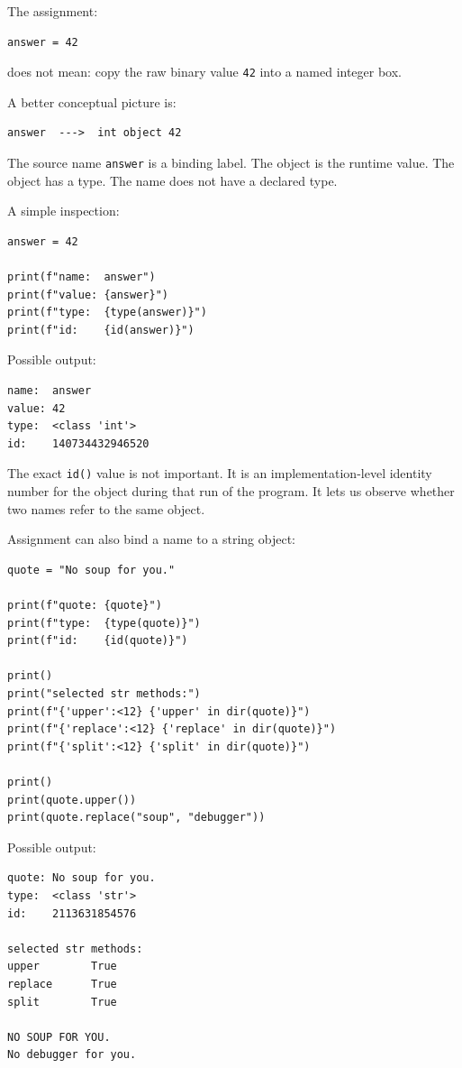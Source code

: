 The assignment:

\begin{verbatim}
answer = 42
\end{verbatim}

does not mean: copy the raw binary value \texttt{42} into a named integer box.

A better conceptual picture is:

\begin{verbatim}
answer  --->  int object 42
\end{verbatim}

The source name \texttt{answer} is a binding label. The object is the runtime value. The object has a type. The name does not have a declared type.

A simple inspection:

\begin{verbatim}
answer = 42

print(f"name:  answer")
print(f"value: {answer}")
print(f"type:  {type(answer)}")
print(f"id:    {id(answer)}")
\end{verbatim}

Possible output:

\begin{verbatim}
name:  answer
value: 42
type:  <class 'int'>
id:    140734432946520
\end{verbatim}

The exact \texttt{id()} value is not important. It is an implementation-level identity number for the object during that run of the program. It lets us observe whether two names refer to the same object.

Assignment can also bind a name to a string object:

\begin{verbatim}
quote = "No soup for you."

print(f"quote: {quote}")
print(f"type:  {type(quote)}")
print(f"id:    {id(quote)}")

print()
print("selected str methods:")
print(f"{'upper':<12} {'upper' in dir(quote)}")
print(f"{'replace':<12} {'replace' in dir(quote)}")
print(f"{'split':<12} {'split' in dir(quote)}")

print()
print(quote.upper())
print(quote.replace("soup", "debugger"))
\end{verbatim}

Possible output:

\begin{verbatim}
quote: No soup for you.
type:  <class 'str'>
id:    2113631854576

selected str methods:
upper        True
replace      True
split        True

NO SOUP FOR YOU.
No debugger for you.
\end{verbatim}

